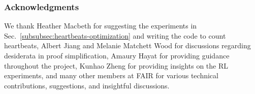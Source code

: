 \subsubsection*{Acknowledgments}
We thank Heather Macbeth for suggesting the experiments in Sec.~\ref{subsubsec:heartbeats-optimization} and writing the code to count heartbeats, Albert Jiang and Melanie Matchett Wood for discussions regarding desiderata in proof simplification, Amaury Hayat for providing guidance throughout the project, Kunhao Zheng for providing insights on the RL experiments, and many other members at FAIR for various technical contributions, suggestions, and insightful discussions.